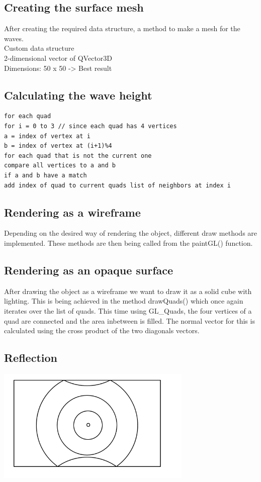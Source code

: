 \documentclass[12pt,a4paper]{scrartcl}
\begin{document}
\subsection{Creating the surface mesh}
After creating the required data structure, a method to make a mesh for the waves.\\
Custom data structure\\
2-dimensional vector of QVector3D\\
Dimensions: 50 x 50 -> Best result\\

\subsection{Calculating the wave height}
\begin{lstlisting}[language=PSEUDO]
for each quad
for i = 0 to 3 // since each quad has 4 vertices
a = index of vertex at i
b = index of vertex at (i+1)%4
for each quad that is not the current one
compare all vertices to a and b
if a and b have a match
add index of quad to current quads list of neighbors at index i 
\end{lstlisting}

\subsection{Rendering as a wireframe}
Depending on the desired way of rendering the object, different draw methods are implemented. These methods are then being called from the paintGL() function.

\subsection{Rendering as an opaque surface}
After drawing the object as a wireframe we want to draw it as a solid cube with lighting. This is being achieved in the method drawQuads() which once again iterates over the list of quads. This time using GL_Quads, the four vertices of a quad are connected and the area inbetween is filled. The normal vector for this is calculated using the cross product of the two diagonals vectors.

\subsection{Reflection}

\includegraphics[width=0.7\textwidth]{Images/Reflextion.png}
\end{document}
